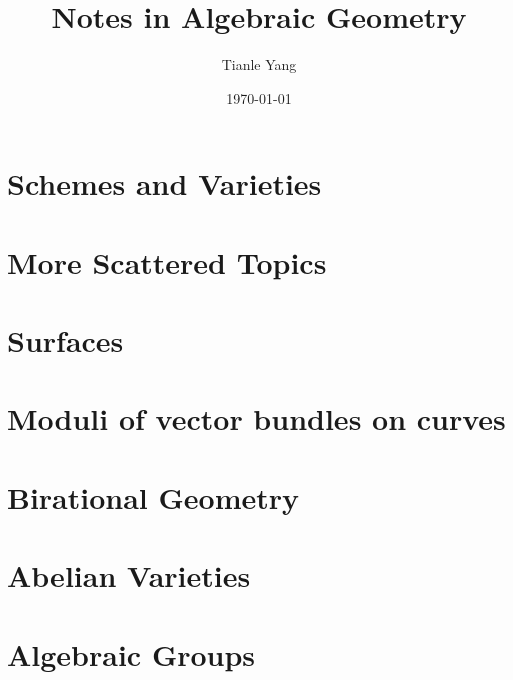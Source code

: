 \documentclass[sectionlevel=book]{noteformyself}
\title{Notes in Algebraic Geometry}
\author{Tianle Yang}
\date{\today}
\begin{document}
    \maketitle

    \frontmatter

    \tableofcontents

    \mainmatter

    \chapter{Schemes and Varieties}
        
        
        

    \chapter{More Scattered Topics}

    \chapter{Surfaces}
        
        

    \chapter{Moduli of vector bundles on curves}
        

    \chapter{Birational Geometry}
        
        
        

    \chapter{Abelian Varieties}
        
        

    \chapter{Algebraic Groups}
        
        



    \printbibliography[heading=bibintoc, title={References}]
    
\end{document}
